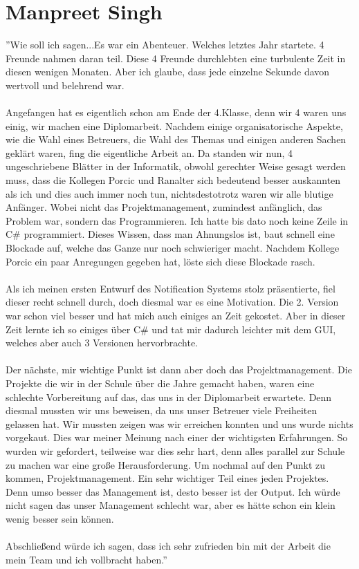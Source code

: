 \documentclass[12pt,a4paper]{report}
\begin{document}
\chapter{Manpreet Singh}
''Wie soll ich sagen...Es war ein Abenteuer. Welches letztes Jahr startete. 4 Freunde nahmen daran teil. Diese 4 Freunde durchlebten eine turbulente Zeit in diesen wenigen Monaten. Aber ich glaube, dass jede einzelne Sekunde davon wertvoll und belehrend war. \\\\
Angefangen hat es eigentlich schon am Ende der 4.Klasse, denn wir 4 waren uns einig, wir machen eine Diplomarbeit. Nachdem einige organisatorische Aspekte, wie die Wahl eines Betreuers, die Wahl des Themas und einigen anderen Sachen geklärt waren, fing die eigentliche Arbeit an. Da standen wir nun, 4 ungeschriebene Blätter in der Informatik, obwohl gerechter Weise gesagt werden muss, dass die Kollegen Porcic und Ranalter sich bedeutend besser auskannten als ich und dies auch immer noch tun, nichtsdestotrotz waren wir alle blutige Anfänger. Wobei nicht das Projektmanagement, zumindest anfänglich, das Problem war, sondern das Programmieren. Ich hatte bis dato noch keine Zeile in C\# programmiert. Dieses Wissen, dass man Ahnungslos ist, baut schnell eine Blockade auf, welche das Ganze nur noch schwieriger macht. Nachdem Kollege Porcic ein paar Anregungen gegeben hat, löste sich diese Blockade rasch.\\\\
Als ich meinen ersten Entwurf des Notification Systems stolz präsentierte, fiel dieser recht schnell durch, doch diesmal war es eine Motivation. Die 2. Version war schon viel besser und hat mich auch einiges an Zeit gekostet. Aber in dieser Zeit lernte ich so einiges über C\# und tat mir dadurch leichter mit dem GUI, welches aber auch 3 Versionen hervorbrachte.\\\\
Der nächste, mir wichtige Punkt ist dann aber doch das Projektmanagement. Die Projekte die wir in der Schule über die Jahre gemacht haben, waren eine schlechte Vorbereitung auf das, das uns in der Diplomarbeit erwartete. Denn diesmal mussten wir uns beweisen, da uns unser Betreuer viele Freiheiten gelassen hat. Wir mussten zeigen was wir erreichen konnten und uns wurde nichts vorgekaut. Dies war meiner Meinung nach einer der wichtigsten Erfahrungen. So wurden wir gefordert, teilweise war dies sehr hart, denn alles parallel zur Schule zu machen war eine große Herausforderung. Um nochmal auf den Punkt zu kommen, Projektmanagement. Ein sehr wichtiger Teil eines jeden Projektes. Denn umso besser das Management ist, desto besser ist der Output. Ich würde nicht sagen das unser Management schlecht war, aber es hätte schon ein klein wenig besser sein können.\\\\
Abschließend würde ich sagen, dass ich sehr zufrieden bin mit der Arbeit die mein Team und ich vollbracht haben.''
\end{document}
